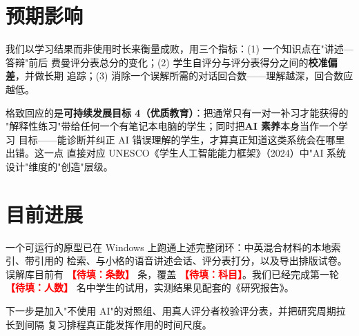 \documentclass[11pt,a4paper,UTF8,fontset=windows]{ctexart}
\newcommand{\fillin}[1]{\textcolor{red}{\textbf{【待填：#1】}}}
\begin{document}
\section{预期影响}

我们以学习结果而非使用时长来衡量成败，用三个指标：(1) 一个知识点在"讲述—答辩"前后
费曼评分表总分的变化；(2) 学生自评分与评分表得分之间的\textbf{校准偏差}，并做长期
追踪；(3) 消除一个误解所需的对话回合数——理解越深，回合数应越低。

格致回应的是\textbf{可持续发展目标 4（优质教育）}：把通常只有一对一补习才能获得的
"解释性练习"带给任何一个有笔记本电脑的学生；同时把\textbf{AI 素养}本身当作一个学习
目标——能诊断并纠正 AI 错误理解的学生，才算真正知道这类系统会在哪里出错。这一点
直接对应 UNESCO《学生人工智能能力框架》（2024）中"AI 系统设计"维度的"创造"层级。

\section{目前进展}

一个可运行的原型已在 Windows 上跑通上述完整闭环：中英混合材料的本地索引、带引用的
检索、与小格的语音讲述会话、评分表打分，以及导出排版试卷。误解库目前有
\fillin{条数} 条，覆盖 \fillin{科目}。我们已经完成第一轮 \fillin{人数}
名中学生的试用，实测结果见配套的《研究报告》。

下一步是加入"不使用 AI"的对照组、用真人评分者校验评分表，并把研究周期拉长到间隔
复习排程真正能发挥作用的时间尺度。
\end{document}
